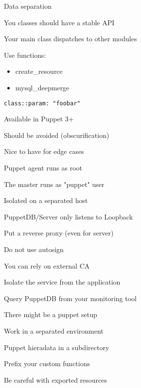 \begin{iframe}[Hiera]
\item Data separation
\item You classes should have a stable API
\item Your main class dispatches to other modules
\item Use functions:
\begin{itemize}
    \item create\_resource
    \item mysql\_deepmerge
\end{itemize}
\end{iframe}
\begin{iframe}
\item{\texttt{class::param: "foobar"}}
\item Available in Puppet 3+
\item Should be avoided (obscurification)
\item Nice to have for edge cases
\end{iframe}

\begin{iframe}[Security]
\item Puppet agent runs as root
\item The master runs as "puppet" user
\item Isolated on a separated host
\item PuppetDB/Server only listens to Loopback
\item Put a reverse proxy (even for server)
\end{iframe}

\begin{iframe}
\item Do not use autosign
\item You can rely on external CA
\item Isolate the service from the application
\item Query PuppetDB from your monitoring tool
\end{iframe}




\begin{iframe}
\item There might be a puppet setup
\item Work in a separated environment
\item Puppet hieradata in a subdirectory
\item Prefix your custom functions
\item Be careful with exported resources
\end{iframe}

